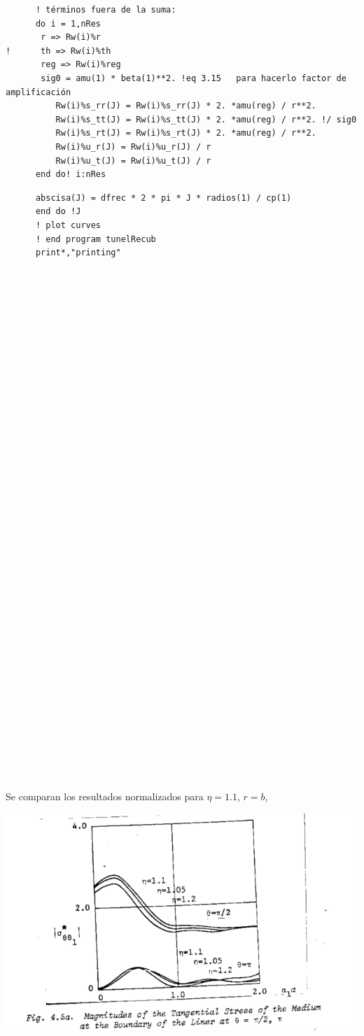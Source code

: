 \documentclass [11pt,spanish]{article}
\begin{document}
\begin{shaded}
\begin{verbatim}
      ! términos fuera de la suma:
      do i = 1,nRes
       r => Rw(i)%r
!      th => Rw(i)%th
       reg => Rw(i)%reg
       sig0 = amu(1) * beta(1)**2. !eq 3.15   para hacerlo factor de amplificación
          Rw(i)%s_rr(J) = Rw(i)%s_rr(J) * 2. *amu(reg) / r**2. 
          Rw(i)%s_tt(J) = Rw(i)%s_tt(J) * 2. *amu(reg) / r**2. !/ sig0
          Rw(i)%s_rt(J) = Rw(i)%s_rt(J) * 2. *amu(reg) / r**2. 
          Rw(i)%u_r(J) = Rw(i)%u_r(J) / r 
          Rw(i)%u_t(J) = Rw(i)%u_t(J) / r 
      end do! i:nRes

\end{verbatim}
\end{shaded}
\endgroup

\begingroup
\fontsize{10pt}{12pt}
\selectfont
{}
\begin{shaded}
\begin{verbatim}
      abscisa(J) = dfrec * 2 * pi * J * radios(1) / cp(1)
      end do !J   
      ! plot curves
      ! end program tunelRecub
      print*,"printing"
      
      
      
      
      
      
      
      
      
      
      
      
      
      
      
      
      
      
      
      
      
      
      
      
      
      
      
      
      
      
      
      
      
      
      
      
      
      
\end{verbatim}
\end{shaded}
\endgroup
Se comparan los resultados normalizados para $\eta=1.1$, $r=b$,

\includegraphics[scale=0.4]{res1}
\end{document}
